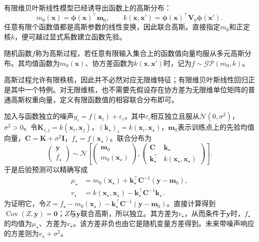 有限维贝叶斯线性模型已经诱导出函数上的高斯分布：
\[
  m_0(\bm{x})=\bm{\phi}(\bm{x})^{\top}\bm{m}_0,\qquad
  k(\bm{x},\bm{x}')=\bm{\phi}(\bm{x})^{\top}\bm{V}_0\bm{\phi}(\bm{x}').
\]
任意有限个函数值都是高斯参数的线性变换，因此联合高斯。直接指定$m_0$和正定核$k$，便可越过显式系数建立函数先验。

\begin{definition}[高斯过程]
  \label{def:regression-gp}
  随机函数$f$称为高斯过程，若任意有限输入集合上的函数值向量均服从多元高斯分布。其均值函数为$m_0(\bm{x})$、协方差函数为$k(\bm{x},\bm{x}')$时，记为$f\sim\mathcal{GP}(m_0,k)$。
\end{definition}

高斯过程允许有限秩核，因此并不必然对应无限维特征；有限维贝叶斯线性回归正是其中一个特例。对无限维核，也不需要先假设存在协方差为无限维单位矩阵的普通高斯权重向量，定义有限函数值的相容联合分布即可。

加入与函数独立的噪声$y_i=f(\bm{x}_i)+\varepsilon_i$，其中$\varepsilon_i$相互独立且服从$\mathcal{N}(0,\sigma^2)$，$\sigma^2>0$。令$\bm{K}_{i,j}=k(\bm{x}_i,\bm{x}_j)$，$(\bm{k}_{\star})_i=k(\bm{x}_i,\bm{x}_{\star})$，$\bm{m}_0$表示训练点上的先验均值向量，$\bm{C}=\bm{K}+\sigma^2\bm{I}$，$f_{\star}=f(\bm{x}_{\star})$。联合分布为
\[
  \begin{pmatrix}\bm{y}\\f_{\star}\end{pmatrix}
  \sim\mathcal{N}\!\left[
    \begin{pmatrix}\bm{m}_0\\m_0(\bm{x}_{\star})\end{pmatrix},
    \begin{pmatrix}
      \bm{C}&\bm{k}_{\star}\\
      \bm{k}_{\star}^{\top}&k(\bm{x}_{\star},\bm{x}_{\star})
    \end{pmatrix}\right].
\]
于是后验预测可以精确写成
\begin{equation}
  \begin{aligned}
    \mu_{\star}
      &=m_0(\bm{x}_{\star})
        +\bm{k}_{\star}^{\top}\bm{C}^{-1}(\bm{y}-\bm{m}_0),\\
    v_{\star}
      &=k(\bm{x}_{\star},\bm{x}_{\star})
        -\bm{k}_{\star}^{\top}\bm{C}^{-1}\bm{k}_{\star}.
  \end{aligned}
  \label{eq:regression-gp-posterior}
\end{equation}
为证明它，令$Z=f_{\star}-m_0(\bm{x}_{\star})-\bm{k}_{\star}^{\top}\bm{C}^{-1}(\bm{y}-\bm{m}_0)$。直接计算得到$\operatorname{Cov}(Z,\bm{y})=\bm{0}$；$Z$与$\bm{y}$联合高斯，所以独立。其方差为$v_{\star}$，从而条件于$\bm{y}$时，$f_{\star}$的均值为$\mu_{\star}$、方差为$v_{\star}$。该方差非负也由它是随机变量方差得到。未来带噪声响应的方差则为$v_{\star}+\sigma^2$。

